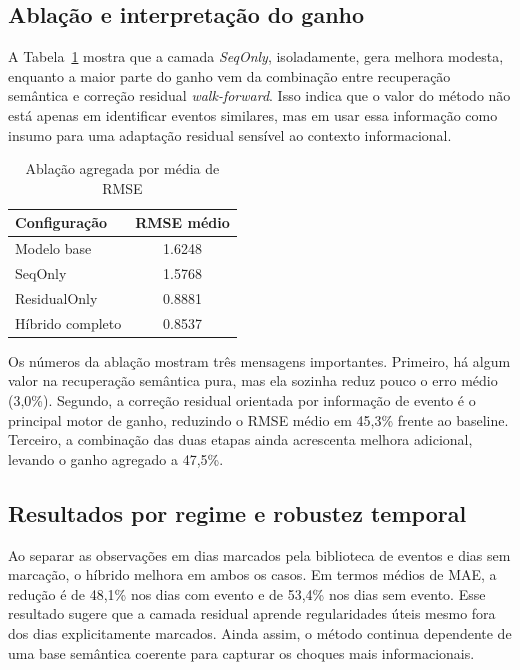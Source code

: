 \documentclass[conference]{IEEEtran}
\begin{document}
\subsection{Ablação e interpretação do ganho}

A Tabela~\ref{tab:ablacao} mostra que a camada \textit{SeqOnly}, isoladamente, gera melhora modesta, enquanto a maior parte do ganho vem da combinação entre recuperação semântica e correção residual \textit{walk-forward}. Isso indica que o valor do método não está apenas em identificar eventos similares, mas em usar essa informação como insumo para uma adaptação residual sensível ao contexto informacional.

\begin{table}[t]
\centering
\caption{Ablação agregada por média de RMSE}
\label{tab:ablacao}
\begin{tabular}{l c}
\toprule
\textbf{Configuração} & \textbf{RMSE médio} \\
\midrule
Modelo base      & 1.6248 \\
SeqOnly          & 1.5768 \\
ResidualOnly     & 0.8881 \\
Híbrido completo & 0.8537 \\
\bottomrule
\end{tabular}
\end{table}

Os números da ablação mostram três mensagens importantes. Primeiro, há algum valor na recuperação semântica pura, mas ela sozinha reduz pouco o erro médio (3,0\%). Segundo, a correção residual orientada por informação de evento é o principal motor de ganho, reduzindo o RMSE médio em 45,3\% frente ao baseline. Terceiro, a combinação das duas etapas ainda acrescenta melhora adicional, levando o ganho agregado a 47,5\%.

\subsection{Resultados por regime e robustez temporal}

Ao separar as observações em dias marcados pela biblioteca de eventos e dias sem marcação, o híbrido melhora em ambos os casos. Em termos médios de MAE, a redução é de 48,1\% nos dias com evento e de 53,4\% nos dias sem evento. Esse resultado sugere que a camada residual aprende regularidades úteis mesmo fora dos dias explicitamente marcados. Ainda assim, o método continua dependente de uma base semântica coerente para capturar os choques mais informacionais.
\end{document}
